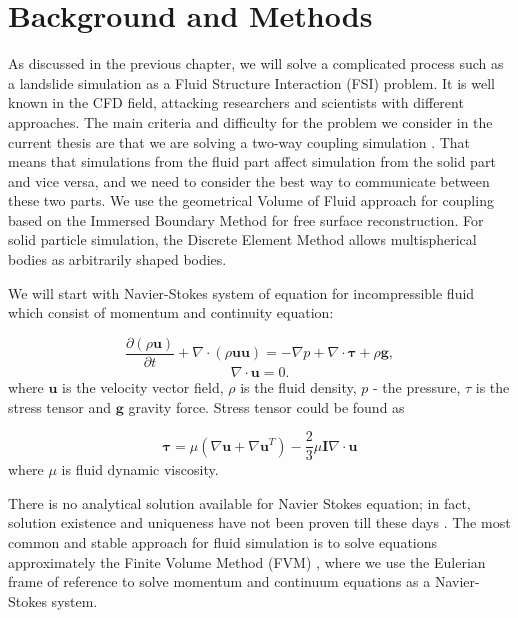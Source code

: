 \chapter{Background and Methods} \label{chap:lit_rev}

As discussed in the previous chapter, we will solve a complicated process such as a landslide simulation as a Fluid Structure Interaction (FSI) problem. It is well known in the CFD field, attacking researchers and scientists with different approaches. The main criteria and difficulty for the problem we consider in the current thesis are that we are solving a two-way coupling simulation \cite{benra2011comparison}. That means that simulations from the fluid part affect simulation from the solid part and vice versa, and we need to consider the best way to communicate between these two parts. We use the geometrical Volume of Fluid approach for coupling based on the Immersed Boundary Method for free surface reconstruction. For solid particle simulation, the Discrete Element Method allows multispherical bodies as arbitrarily shaped bodies.

We will start with Navier-Stokes system of equation for incompressible fluid which consist of momentum and continuity equation:

\begin{equation}\label{NS_methods}
\frac{\partial(\rho \mathbf{u})}{\partial t}+\nabla \cdot(\rho \mathbf{u u})=-\nabla p+\nabla \cdot \boldsymbol{\tau}+\rho \mathbf{g},
\end{equation}
\begin{equation}
\nabla \cdot \mathbf{u}=0.
\end{equation}
where $\mathbf{u}$ is the velocity vector field, $\rho$ is the fluid density, $p$ - the pressure, $\tau$ is the stress tensor and $\mathbf{g}$ gravity force. Stress tensor could be found as

\begin{equation}
\boldsymbol{\tau}=\mu\left(\nabla \boldsymbol{u}+\nabla \boldsymbol{u}^T\right)-\frac{2}{3} \mu \boldsymbol{I} \nabla \cdot \boldsymbol{u}
\end{equation}
where $\mu$ is fluid dynamic viscosity.

There is no analytical solution available for Navier Stokes equation; in fact, solution existence and uniqueness have not been proven till these days \cite{klay}. The most common and stable approach for fluid simulation is to solve equations approximately the Finite Volume Method (FVM) \cite{ferziger2002cfd}, where we use the Eulerian frame of reference to solve momentum and continuum equations as a Navier-Stokes system.

